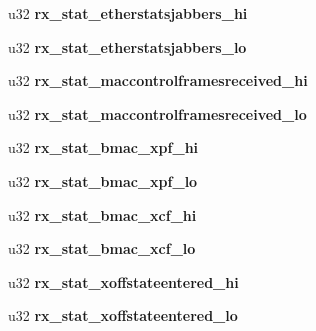 \begin{DoxyCompactItemize}
\item 
\hypertarget{structmac__stx_a11179660e6739115bc372070e8313b8f}{
u32 {\bfseries rx\_\-stat\_\-etherstatsjabbers\_\-hi}}
\label{structmac__stx_a11179660e6739115bc372070e8313b8f}

\item 
\hypertarget{structmac__stx_a1cd0f338176e5af22f3cae68b11c1906}{
u32 {\bfseries rx\_\-stat\_\-etherstatsjabbers\_\-lo}}
\label{structmac__stx_a1cd0f338176e5af22f3cae68b11c1906}

\item 
\hypertarget{structmac__stx_ac0e17949da94f00fd416ca90e2729590}{
u32 {\bfseries rx\_\-stat\_\-maccontrolframesreceived\_\-hi}}
\label{structmac__stx_ac0e17949da94f00fd416ca90e2729590}

\item 
\hypertarget{structmac__stx_aad3ef27a4c5469886db63b61c179826d}{
u32 {\bfseries rx\_\-stat\_\-maccontrolframesreceived\_\-lo}}
\label{structmac__stx_aad3ef27a4c5469886db63b61c179826d}

\item 
\hypertarget{structmac__stx_a089736c25277023372cddf5c51008984}{
u32 {\bfseries rx\_\-stat\_\-bmac\_\-xpf\_\-hi}}
\label{structmac__stx_a089736c25277023372cddf5c51008984}

\item 
\hypertarget{structmac__stx_ad2ec76699b15af296fa4d7f35d96af7f}{
u32 {\bfseries rx\_\-stat\_\-bmac\_\-xpf\_\-lo}}
\label{structmac__stx_ad2ec76699b15af296fa4d7f35d96af7f}

\item 
\hypertarget{structmac__stx_ae43622c15a881c696b460289d529769b}{
u32 {\bfseries rx\_\-stat\_\-bmac\_\-xcf\_\-hi}}
\label{structmac__stx_ae43622c15a881c696b460289d529769b}

\item 
\hypertarget{structmac__stx_a195e2a93269d46e93f142a7f6f5741e0}{
u32 {\bfseries rx\_\-stat\_\-bmac\_\-xcf\_\-lo}}
\label{structmac__stx_a195e2a93269d46e93f142a7f6f5741e0}

\item 
\hypertarget{structmac__stx_a23029fd1006d83ac44cca2316601b3bd}{
u32 {\bfseries rx\_\-stat\_\-xoffstateentered\_\-hi}}
\label{structmac__stx_a23029fd1006d83ac44cca2316601b3bd}

\item 
\hypertarget{structmac__stx_a09859c7d4b9b176de59d5210b45c6d7f}{
u32 {\bfseries rx\_\-stat\_\-xoffstateentered\_\-lo}}
\label{structmac__stx_a09859c7d4b9b176de59d5210b45c6d7f}


\end{DoxyCompactItemize}
